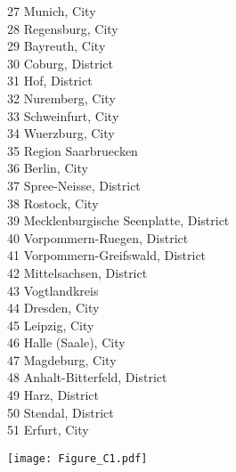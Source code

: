 \documentclass[11pt,oneside,reqno,xcolor=dvipsnames]{article} %
\begin{document}
\begin{appendix}
\begin{refsection}
\begin{landscape}
\begin{figure}[!ht]
{\begin{minipage}[t][5cm][c]{0.225\textwidth}
\begin{flushleft}
{27 Munich, City \vphantom{/} \\[-0.05cm]
28 Regensburg, City \vphantom{/} \\[-0.05cm]
29 Bayreuth, City \vphantom{/} \\[-0.05cm]
30 Coburg, District \vphantom{/} \\[-0.05cm]
31 Hof, District \vphantom{/} \\[-0.05cm]
32 Nuremberg, City \vphantom{/} \\[-0.05cm]
33 Schweinfurt, City \vphantom{/} \\[-0.05cm]
34 Wuerzburg, City \vphantom{/} \\[-0.05cm]
35 Region Saarbruecken \vphantom{/} \\[-0.05cm]
36 Berlin, City \vphantom{/} \\[-0.05cm]
37 Spree-Neisse, District \vphantom{/} \\[-0.05cm]
38 Rostock, City \vphantom{/} \\[-0.05cm]
39 Mecklenburgische Seenplatte, District \vphantom{/} \\[-0.05cm]
40 Vorpommern-Ruegen, District \vphantom{/} \\[-0.05cm]
41 Vorpommern-Greifswald, District \vphantom{/} \\[-0.05cm]
42 Mittelsachsen, District \vphantom{/} \\[-0.05cm]
43 Vogtlandkreis \vphantom{/} \\[-0.05cm]
44 Dresden, City \vphantom{/} \\[-0.05cm]
45 Leipzig, City \vphantom{/} \\[-0.05cm]
46 Halle (Saale), City \vphantom{/} \\[-0.05cm]
47 Magdeburg, City \vphantom{/} \\[-0.05cm]
48 Anhalt-Bitterfeld, District \vphantom{/} \\[-0.05cm]
49 Harz, District \vphantom{/} \\[-0.05cm]
50 Stendal, District \vphantom{/} \\[-0.05cm]
51 Erfurt, City \vphantom{/} \\[-0.05cm]
}

\end{flushleft}
\end{minipage}
}
\begin{minipage}[t][5cm][c]{0.48\textwidth}
\begin{center}
\vspace*{7.9cm}
\texttt{[image: Figure\_C1.pdf]}
\end{center}
\end{minipage}


\end{figure}
\end{landscape}
\end{refsection}
\end{appendix}
\end{document}
